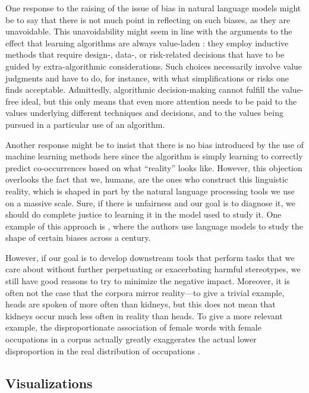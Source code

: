 \documentclass{clv3}
\begin{document}
\label{appendix:philosophical}


One response to the raising of the issue of bias in natural language
	models might be to say that there is not much point in reflecting on
	such biases, as they are unavoidable. This unavoidability might seem in
	line with the arguments to the effect that learning algorithms are
	always value-laden \citep{JohnsonValueFree}: they employ inductive methods that require
	design-, data-, or risk-related decisions that have to be guided by
	extra-algorithmic considerations. Such choices necessarily involve value
	judgments and have to do, for instance, with what simplifications or
	risks one finds acceptable. Admittedly, algorithmic decision-making
	cannot fulfill the value-free ideal, but this only means that even more
	attention needs to be paid to the values underlying different techniques
	and decisions, and to the values being pursued in a particular use of an
	algorithm.
	
	Another response might be to insist that there is no bias introduced by
	the use of machine learning methods here since the algorithm is simply
	learning to correctly predict co-occurrences based on what ``reality''
	looks like. However, this objection overlooks the fact that we, humans,
	are the ones who construct this linguistic reality, which is shaped in
	part by the natural language processing tools we use on a massive scale.
	Sure, if there is unfairness and our goal is to diagnose it, we should
	do complete justice to learning it in the model used to study it. One
	example of this approach is \citep{Garg2017hundredYears}, where the authors use language
	models to study the shape of certain biases across a century.
	
	However, if our goal is to develop downstream tools that perform tasks
	that we care about without further perpetuating or exacerbating harmful
	stereotypes, we still have good reasons to try to minimize the negative
	impact. Moreover, it is often not the case that the corpora mirror
	reality---to give a trivial example, heads are spoken of more often than
	kidneys, but this does not mean that kidneys occur much less often in
	reality than heads. To give a more relevant example, the
	disproportionate association of female words with female occupations in
	a corpus actually greatly exaggerates the actual lower disproportion in
	the real distribution of occupations \citep{gordon2012reporting}.
	
	
\hypertarget{visualizations}{%
\subsection{Visualizations}\label{visualizations}}
\end{document}
